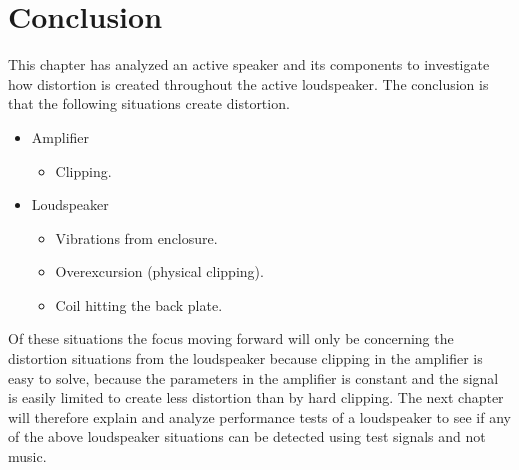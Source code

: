 \section{Conclusion}
This chapter has analyzed an active speaker and its components to investigate how distortion is created throughout the active loudspeaker. The conclusion is that the following situations create distortion.
\begin{itemize}
\item Amplifier
	\begin{itemize}
	\item Clipping.
	\end{itemize}
\item Loudspeaker
	\begin{itemize}
	\item Vibrations from enclosure.
	\item Overexcursion (physical clipping).
	\item Coil hitting the back plate.
	\end{itemize}
\end{itemize}
Of these situations the focus moving forward will only be concerning the distortion situations from the loudspeaker because clipping in the amplifier is easy to solve, because the parameters in the amplifier is constant and the signal is easily limited to create less distortion than by hard clipping. The next chapter will therefore explain and analyze performance tests of a loudspeaker to see if any of the above loudspeaker situations can be detected using test signals and not music. 